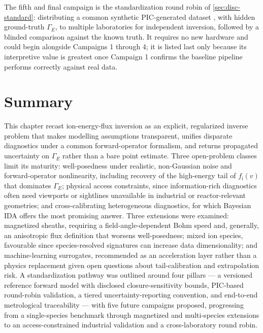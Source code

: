 The fifth and final campaign is the standardization round robin of \cref{sec:disc-standard}: distributing a common synthetic PIC-generated dataset \cite{ref0631,ref0633,ref0655}, with hidden ground-truth $\Gamma_{E}$, to multiple laboratories for independent inversion, followed by a blinded comparison against the known truth. It requires no new hardware and could begin alongside Campaigns 1 through 4; it is listed last only because its interpretive value is greatest once Campaign 1 confirms the baseline pipeline performs correctly against real data.

\section{Summary}

This chapter recast ion-energy-flux inversion as an explicit, regularized inverse problem that makes modelling assumptions transparent, unifies disparate diagnostics under a common forward-operator formalism, and returns propagated uncertainty on $\Gamma_{E}$ rather than a bare point estimate. Three open-problem classes limit its maturity: well-posedness under realistic, non-Gaussian noise and forward-operator nonlinearity, including recovery of the high-energy tail of $f_{\mathrm{i}}(v)$ that dominates $\Gamma_{E}$; physical access constraints, since information-rich diagnostics often need viewports or sightlines unavailable in industrial or reactor-relevant geometries; and cross-calibrating heterogeneous diagnostics, for which Bayesian IDA offers the most promising answer. Three extensions were examined: magnetized sheaths, requiring a field-angle-dependent Bohm speed and, generally, an anisotropic flux definition that worsens well-posedness; mixed ion species, favourable since species-resolved signatures can increase data dimensionality; and machine-learning surrogates, recommended as an acceleration layer rather than a physics replacement given open questions about tail-calibration and extrapolation risk. A standardization pathway was outlined around four pillars — a versioned reference forward model with disclosed closure-sensitivity bounds, PIC-based round-robin validation, a tiered uncertainty-reporting convention, and end-to-end metrological traceability — with five future campaigns proposed, progressing from a single-species benchmark through magnetized and multi-species extensions to an access-constrained industrial validation and a cross-laboratory round robin.

